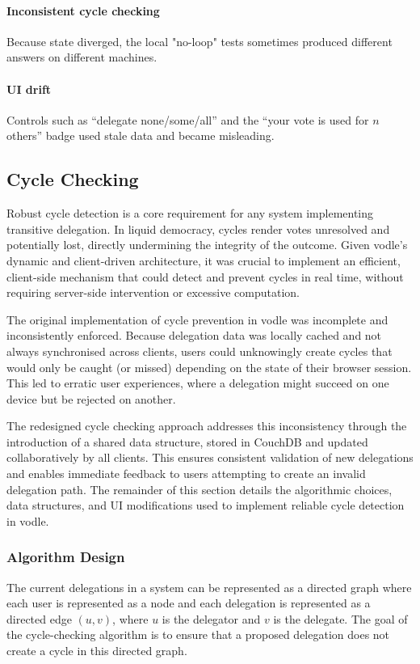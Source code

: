 \paragraph{Inconsistent cycle checking} Because state diverged, the local "no-loop" tests sometimes produced different answers on different machines.
\paragraph{UI drift} Controls such as ``delegate none/some/all'' and the ``your vote is used for \(n\) others'' badge used stale data and became misleading.

\subsection{Cycle Checking}
Robust cycle detection is a core requirement for any system implementing transitive delegation. In liquid democracy, cycles render votes unresolved and potentially lost, directly undermining the integrity of the outcome. Given vodle's dynamic and client-driven architecture, it was crucial to implement an efficient, client-side mechanism that could detect and prevent cycles in real time, without requiring server-side intervention or excessive computation.

The original implementation of cycle prevention in vodle was incomplete and inconsistently enforced. Because delegation data was locally cached and not always synchronised across clients, users could unknowingly create cycles that would only be caught (or missed) depending on the state of their browser session. This led to erratic user experiences, where a delegation might succeed on one device but be rejected on another.

The redesigned cycle checking approach addresses this inconsistency through the introduction of a shared data structure, stored in CouchDB and updated collaboratively by all clients. This ensures consistent validation of new delegations and enables immediate feedback to users attempting to create an invalid delegation path. The remainder of this section details the algorithmic choices, data structures, and UI modifications used to implement reliable cycle detection in vodle.

\subsubsection{Algorithm Design}
The current delegations in a system can be represented as a directed graph where each user is represented as a node and each delegation is represented as a directed edge $(u,v)$, where $u$ is the delegator and $v$ is the delegate. The goal of the cycle-checking algorithm is to ensure that a proposed delegation does not create a cycle in this directed graph.

